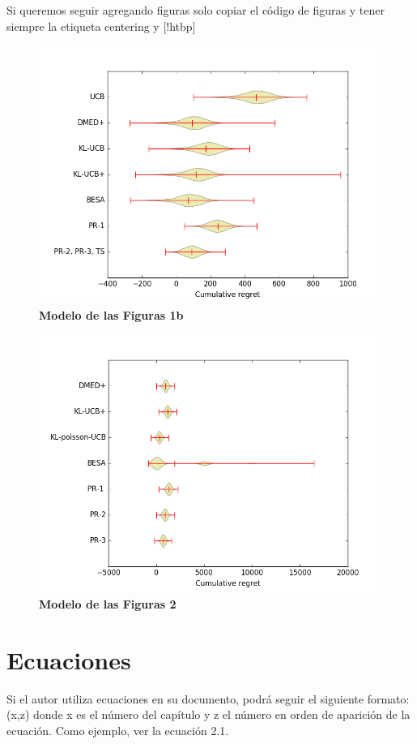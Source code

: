 Si queremos seguir agregando figuras solo copiar el código de figuras y tener siempre la etiqueta centering y [!htbp]

\begin{figure}[!htbp]
    \centering
    \includegraphics[width=0.85\linewidth]{recursos/Figure1b.png}
    \caption{\textbf{Modelo de las Figuras 1b \cite{upm56279}}}
    \label{fig:figura1a}
\end{figure}

\begin{figure}[!htbp]
    \centering
    \includegraphics[width=0.85\linewidth]{recursos/Figure2.png}
    \caption{\textbf{Modelo de las Figuras 2 \cite{upm56279}}}
    \label{fig:figura1a}
\end{figure}

\section{Ecuaciones}
Si el autor utiliza ecuaciones en su documento, podrá seguir el siguiente formato: (x,z) donde x es el número del capítulo y z el número en orden de aparición de la ecuación. Como ejemplo, ver la ecuación 2.1.

